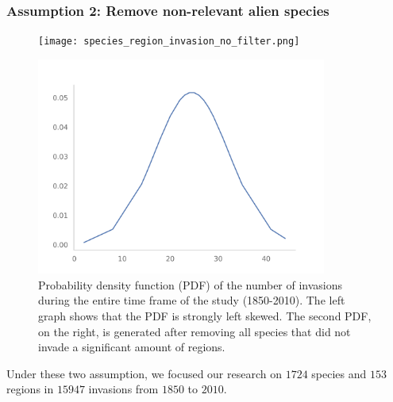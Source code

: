 \documentclass[
	11pt, %
]{beamer}
\begin{document}
\begin{frame}
\frametitle{Assumption 2: Remove non-relevant alien species}
\begin{figure}
\centering
\begin{minipage}{.5\textwidth}
  \centering
    \texttt{[image: species\_region\_invasion\_no\_filter.png]}
\end{minipage}%
\begin{minipage}{.5\textwidth}
  \centering
    \includegraphics[width=0.85\textwidth]{species_region_invasion.png}
\end{minipage}
\caption{Probability density function (PDF) of the number of invasions during the entire time frame of the study (1850-2010). The left graph shows that the PDF is strongly left skewed. The second PDF, on the right, is generated after removing all species that did not invade a significant amount of regions.}
\label{fig:pdf_invasion}
\end{figure}

\end{frame}


\begin{frame}
Under these two assumption, we focused our research on $1724$ species and $153$ regions in $15947$ invasions from $1850$ to $2010$.
\end{frame}

\end{document}
